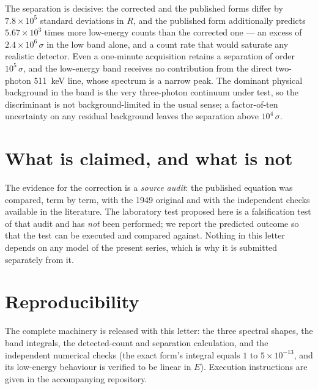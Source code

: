 \documentclass[letter]{aa}
\begin{document}
The separation is decisive: the corrected and the published forms
differ by $7.8\times 10^{5}$ standard deviations in $R$, and the
published form additionally predicts $5.67\times 10^{3}$ times more
low-energy counts than the corrected one --- an excess of
$2.4\times 10^{6}\,\sigma$ in the low band alone, and a count rate
that would saturate any realistic detector. Even a one-minute
acquisition retains a separation of order $10^{5}\,\sigma$, and
the low-energy band receives no contribution from the direct
two-photon 511~keV line, whose spectrum is a narrow peak. The
dominant physical background in the band is the very three-photon
continuum under test, so the discriminant is not background-limited
in the usual sense; a factor-of-ten uncertainty on any residual
background leaves the separation above $10^{4}\,\sigma$.

\section{What is claimed, and what is not}
The evidence for the correction is a \emph{source audit}: the
published equation was compared, term by term, with the 1949 original
and with the independent checks available in the literature. The
laboratory test proposed here is a falsification test of that audit
and has \emph{not} been performed; we report the predicted
outcome so that the test can be executed and compared against.
Nothing in this letter depends on any model of the present series,
which is why it is submitted separately from it.

\section{Reproducibility}
The complete machinery is released with this letter: the three
spectral shapes, the band integrals, the detected-count and
separation calculation, and the independent numerical checks
(the exact form's integral equals $1$ to $5\times 10^{-13}$, and
its low-energy behaviour is verified to be linear in $E$).
Execution instructions are given in the accompanying repository.

\nocite{ps95}



\end{document}

